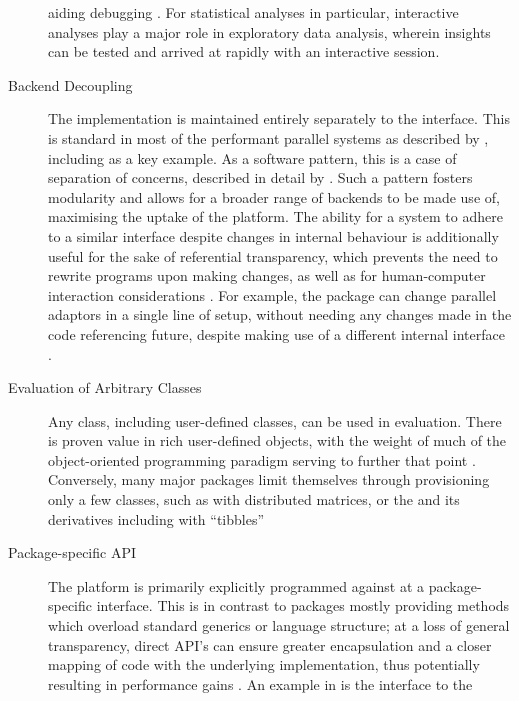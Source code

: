\begin{description}
    aiding debugging \cite{mccarthy1978history}. For statistical analyses
    in particular, interactive analyses play a major role in exploratory
    data analysis, wherein insights can be tested and arrived at rapidly
    with an interactive session.
  \item[Backend Decoupling]
    The implementation is maintained entirely separately to the interface.
    This is standard in most of the performant parallel \R{} systems as
    described by \textcite{eddelbuettel2019parallel}, including  as a key
    example\cite{microsoft20}. As a software pattern, this is a case of
    separation of concerns, described in detail by \textcite{dijkstra1982role}.
    Such a pattern fosters modularity and allows for a broader range of
    backends to be made use of, maximising the uptake of the platform. The
    ability for a system to adhere to a similar interface despite changes in
    internal behaviour is additionally useful for the sake of referential
    transparency, which prevents the need to rewrite programs upon making
    changes, as well as for human-computer interaction considerations
    \cites{sondergaard1990Rtda,norman2013design}. For example, the 
    package can change parallel adaptors in a single line of setup, without
    needing any changes made in the code referencing future, despite making
    use of a different internal interface \cite{weston19:_using}.
  \item[Evaluation of Arbitrary Classes]
    Any class, including user-defined classes, can be used in evaluation.
    There is proven value in rich user-defined objects, with the weight of
    much of the object-oriented programming paradigm serving to further that
    point \cite{dahl2004simula}. Conversely, many major packages limit
    themselves through provisioning only a few classes, such as  with
    distributed matrices, or the  and its derivatives including
     with ``tibbles'' \cites{pbdDMATpackage,wickham2019welcome}
  \item[Package-specific API]
    The platform is primarily explicitly programmed against at a
    package-specific interface. This is in contrast to packages mostly
    providing methods which overload standard generics or language
    structure; at a loss of general transparency, direct API's can ensure
    greater encapsulation and a closer mapping of code with the underlying
    implementation, thus potentially resulting in performance gains
    \cite{bierhoff2009api}. An example in \R{} is the interface to the 

\end{description}
